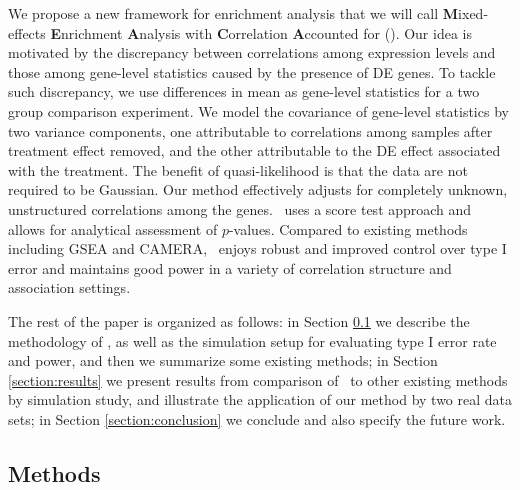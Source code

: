 	
	
	We propose a new framework for enrichment analysis that we will call \textbf{M}ixed-effects 
	\textbf{E}nrichment \textbf{A}nalysis with \textbf{C}orrelation \textbf{A}ccounted for 
	(\OurMethod). Our idea is motivated by the discrepancy between correlations
	among expression levels and those among gene-level statistics caused by the presence of DE 
	genes.
	To tackle such discrepancy, we use differences in mean as gene-level statistics for a two group
	comparison experiment. We model the covariance of gene-level statistics by two variance 
	components,
	one attributable to correlations among samples after treatment effect removed, and the other
	attributable to the DE effect associated with the treatment. The benefit of quasi-likelihood is 
	that
	the data are not required to be Gaussian. Our method effectively adjusts for completely unknown,
	unstructured correlations among the genes. \OurMethod~uses a score test approach and allows for
	analytical assessment of $p$-values. Compared to existing methods including GSEA and CAMERA,
	\OurMethod~enjoys robust and improved control over type I error and maintains good power in a
	variety of correlation structure and association settings. 
	
	The rest of the paper is organized as follows: in Section \ref{section:methods} we describe the
	methodology of \OurMethod, as well as the simulation setup for evaluating type I error rate and 
	power, and then we summarize some existing methods; in
	Section \ref{section:results} we present results from comparison of \OurMethod~to other existing
	methods by simulation study, and illustrate the application of our method by two real data 
	sets; in Section \ref{section:conclusion} we conclude and also specify the future work.
	
	
	
	\subsection{Methods}\label{section:methods}
		
